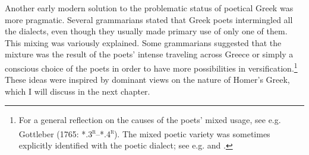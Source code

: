 \documentclass[output=paper]{langsci/langscibook}
\begin{document}
Another early modern solution to the problematic status of poetical Greek was more pragmatic. Several grammarians stated that Greek poets intermingled all the dialects, even though they usually made primary use of only one of them. This mixing was variously explained. Some grammarians suggested that the mixture was the result of the poets’ intense traveling across Greece or simply a conscious choice of the poets in order to have more possibilities in versification.\footnote{For a general reflection on the causes of the poets’ mixed usage, see e.g. Gottleber (1765: *.3\textsc{\textsuperscript{r}}–*.4\textsc{\textsuperscript{r}}). The mixed poetic variety was sometimes explicitly identified with the poetic dialect; see e.g. \citet[111]{Bayly1756} and \citet[198]{Peternader1776}.} These ideas were inspired by dominant views on the nature of Homer’s Greek, which I will discuss in the next chapter.
\end{document}
